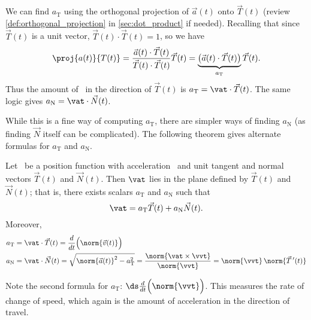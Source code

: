 We can find $a_{\text{T}}$ using the orthogonal projection of $\vec a(t)$ onto $\vec T(t)$ (review \autoref{def:orthogonal_projection} in \autoref{sec:dot_product} if needed).
Recalling that since $\vec T(t)$ is a unit vector, $\vec T(t)\cdot\vec T(t)=1$, so we have 
\[\proj{a(t)}{T(t)} = \frac{\vec a(t)\cdot\vec T(t)}{\vec T(t)\cdot\vec T(t)}\vec T(t) = \underbrace{\big(\vec a(t)\cdot\vec T(t)\big)}_{a_{\text{T}}}\vec T(t).\]
Thus the amount of \vat\ in the direction of $\vec T(t)$ is $a_{\text{T}}=\vat\cdot\vec T(t)$. The same logic gives $a_{\text{N}} = \vat\cdot\vec N(t)$.

While this is a fine way of computing $a_{\text{T}}$, there are simpler ways of finding $a_{\text{N}}$ (as finding $\vec N$ itself can be complicated). The following theorem gives alternate formulas for $a_{\text{T}}$ and $a_{\text{N}}$.

\setboxwidth{20pt}
{Let \vrt\ be a position function with acceleration \vat\ and unit tangent and normal vectors $\vec T(t)$ and $\vec N(t)$. Then $\vat$ lies in the plane defined by $\vec T(t)$ and $\vec N(t)$; that is, there exists scalars $a_\text{T}$ and $a_\text{N}$ such that
\[\vat = a_\text{T}\vec T(t) + a_\text{N}\vec N(t).\]
Moreover,
\begin{align*}
a_\text{T} &= \vat\cdot\vec T(t) = \frac{d}{dt}\Big(\norm{\vec v(t)}\Big) \\
a_\text{N} &= \vat\cdot \vec N(t) = \sqrt{\norm{\vec a(t)}^2-a_\text{T}^2} = \frac{\norm{\vat\times\vvt}}{\norm{\vvt}} = \norm{\vvt}\,\norm{\vec T\,'(t)}
\end{align*}}

Note the second formula for $a_\text{T}$: $\ds \frac{d}{dt}\Big(\norm{\vvt}\Big)$. This measures the rate of change of speed, which again is the amount of acceleration in the direction of travel.

